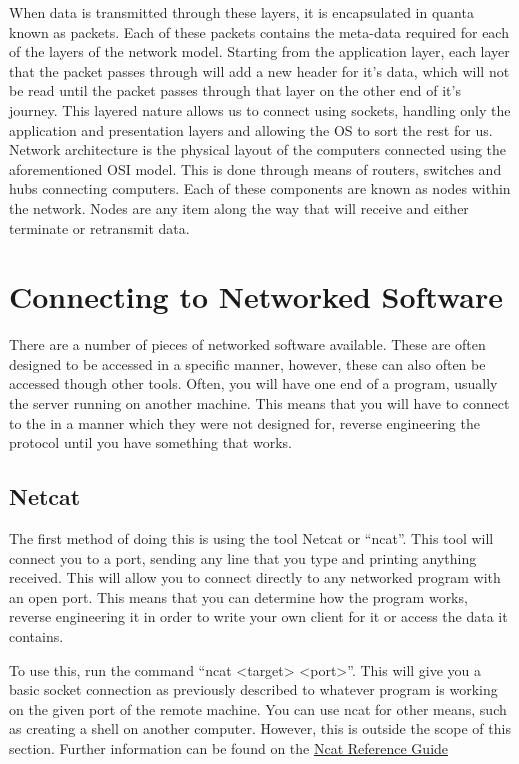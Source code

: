 \documentclass[a4paper,11pt]{report}
\begin{document}
		When data is transmitted through these layers, it is encapsulated in quanta known as packets. 
		Each of these packets contains the meta-data required for each of the layers of the network model. 
		Starting from the application layer, each layer that the packet passes through will add a new header for it's data, which will not be read until the packet passes through that layer on the other end of it's journey. 
		This layered nature allows us to connect using sockets, handling only the application and presentation layers and allowing the OS to sort the rest for us. 
		Network architecture is the physical layout of the computers connected using the aforementioned OSI model. 
		This is done through means of routers, switches and hubs connecting computers. 
		Each of these components are known as nodes within the network. 
		Nodes are any item along the way that will receive and either terminate or retransmit data. 

		
	\section{Connecting to Networked Software}
		There are a number of pieces of networked software available. 
		These are often designed to be accessed in a specific manner, however, these can also often be accessed though other tools. 
		Often, you will have one end of a program, usually the server running on another machine. 
		This means that you will have to connect to the in a manner which they were not designed for, 
		reverse engineering the protocol until you have something that works. 

		\subsection{Netcat}
			The first method of doing this is using the tool Netcat or ``ncat''. 
			This tool will connect you to a port, sending any line that you type and printing anything received. 
			This will allow you to connect directly to any networked program with an open port.
			This means that you can determine how the program works, reverse engineering it in order to write your own client for it or access the data it contains. 

			To use this, run the command ``ncat <target> <port>''. 
			This will give you a basic socket connection as previously described to whatever program is working on the given port of the remote machine. 
			You can use ncat for other means, such as creating a shell on another computer. 
			However, this is outside the scope of this section. 
			Further information can be found on the \href{https://nmap.org/book/ncat-man.html}{Ncat Reference Guide}
\end{document}
